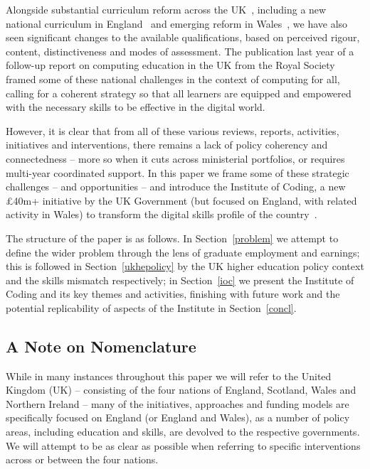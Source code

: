 \documentclass[sigconf,anonymous]{acmart}
\begin{document}
Alongside substantial curriculum reform across the
UK~\cite{crick+sentance:2011,brown-et-al:sigcse2013,brown-et-al:toce2014},
including a new national curriculum in England~\cite{DfE2013a} and
emerging reform in
Wales~\cite{wgictreview:2013,crick+moller:wipsce2015,moller+crick:jce2018},
we have also seen significant changes to the available qualifications,
based on perceived rigour, content, distinctiveness and modes of
assessment. The publication last year of a follow-up report on
computing education in the UK from the Royal Society~\cite{rs:2017}
framed some of these national challenges in the context of computing
for all, calling for a coherent strategy so that all learners are
equipped and empowered with the necessary skills to be effective in
the digital world.

However, it is clear that from all of these various reviews, reports,
activities, initiatives and interventions, there remains a lack of
policy coherency and connectedness -- more so when it cuts across
ministerial portfolios, or requires multi-year coordinated support. In
this paper we frame some of these strategic challenges -- and
opportunities -- and introduce the Institute of Coding, a new
\pounds40m+ initiative by the UK Government (but focused on England,
with related activity in Wales) to transform the digital skills
profile of the country~\cite{davenport-et-al:cep2019}.

The structure of the paper is as follows. In Section~\ref{problem} we
attempt to define the wider problem through the lens of graduate
employment and earnings; this is followed in Section~\ref{ukhepolicy}
by the UK higher education policy context and the skills mismatch
respectively; in Section~\ref{ioc} we present the Institute of Coding
and its key themes and activities, finishing with future work and the
potential replicability of aspects of the Institute in
Section~\ref{concl}.


\subsection{A Note on Nomenclature}

While in many instances throughout this paper we will refer to the
United Kingdom (UK) -- consisting of the four nations of England,
Scotland, Wales and Northern Ireland -- many of the %
initiatives, approaches and funding models are specifically focused on
England (or England and Wales), as a number of policy areas,
including education and skills, are devolved to the respective
governments. We will attempt to be as clear as possible when referring
to specific interventions across or between the four nations.
\end{document}
